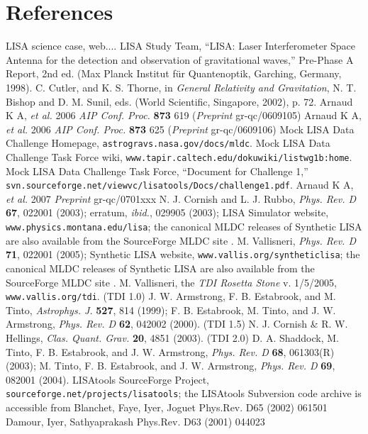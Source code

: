 \documentclass[12pt]{iopart}
\begin{document}
\section*{References}
\begin{thebibliography}{10}
 LISA science case, web....
 LISA Study Team, ``LISA: Laser Interferometer Space Antenna for the detection and observation of gravitational waves,'' Pre-Phase A Report, 2nd ed. (Max Planck Institut f\"ur Quantenoptik, Garching, Germany, 1998).
%
 C. Cutler, and K. S. Thorne, in \emph{General Relativity and Gravitation}, N. T. Bishop and D. M. Sunil, eds. (World Scientific, Singapore, 2002), p. 72.
 Arnaud K A, {\it et al.} 2006 {\it AIP Conf. Proc.} {\bf 873} 619 ({\it Preprint} gr-qc/0609105)
 Arnaud K A, {\it et al.} 2006 {\it AIP Conf. Proc.} {\bf 873} 625 ({\it Preprint} gr-qc/0609106)
 Mock LISA Data Challenge Homepage, {\tt astrogravs.nasa.gov/docs/mldc}.
 Mock LISA Data Challenge Task Force wiki, {\tt www.tapir.caltech.edu/dokuwiki/listwg1b:home}.
 Mock LISA Data Challenge Task Force, ``Document for Challenge 1,'' \texttt{svn.sourceforge.net/viewvc/lisatools/Docs/challenge1.pdf}.
 Arnaud K A, {\it et al.} 2007 {\it Preprint} gr-qc/0701xxx
 N. J. Cornish and L. J. Rubbo, \emph{Phys. Rev. D} \textbf{67}, 022001 (2003); erratum, \emph{ibid.}, 029905 (2003); LISA Simulator website, \texttt{www.physics.montana.edu/lisa}; the canonical MLDC releases of Synthetic LISA are also available from the SourceForge MLDC site \cite{lisatools}.
 M. Vallisneri, \emph{Phys. Rev. D} \textbf{71}, 022001 (2005); Synthetic LISA website, \texttt{www.vallis.org/syntheticlisa}; the canonical MLDC releases of Synthetic LISA are also available from the SourceForge MLDC site \cite{lisatools}.
 M. Vallisneri, the \emph{TDI Rosetta Stone} v. 1/5/2005, \texttt{www.vallis.org/tdi}.
 (TDI 1.0) J. W. Armstrong, F. B. Estabrook, and M. Tinto,
\emph{Astrophys. J.} \textbf{527}, 814 (1999); F. B. Estabrook, M. Tinto, and J. W. Armstrong, \emph{Phys. Rev. D} \textbf{62}, 042002 (2000).
 (TDI 1.5) N. J. Cornish \& R. W. Hellings, \emph{Clas. Quant. Grav.} \textbf{20}, 4851 (2003).
 (TDI 2.0) D. A. Shaddock, M. Tinto, F. B. Estabrook, and J. W. Armstrong, \emph{Phys. Rev. D} \textbf{68}, 061303(R) (2003); M. Tinto, F. B. Estabrook, and J. W. Armstrong, \emph{Phys. Rev. D} \textbf{69}, 082001 (2004).
 LISAtools SourceForge Project, \texttt{sourceforge.net/projects/lisatools}; the LISAtools Subversion code archive is accessible from 
 Blanchet, Faye, Iyer, Joguet Phys.Rev. D65 (2002) 061501
 Damour, Iyer, Sathyaprakash Phys.Rev. D63 (2001) 044023


\end{thebibliography}
\end{document}
